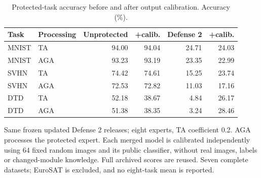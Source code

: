 \begin{table}[t]
\centering\small
\setlength{\tabcolsep}{4pt}
\caption{Protected-task accuracy before and after output calibration. Accuracy (\%).}
\label{tab:defense2_eight_calibration_target}
\begin{tabular}{@{}llrrrr@{}}
\toprule
Task & Processing & Unprotected & +calib. & Defense 2 & +calib. \\
\midrule
MNIST & TA & 94.00 & 94.04 & 24.71 & 24.03 \\
MNIST & AGA & 93.23 & 93.19 & 23.35 & 22.99 \\
\midrule
SVHN & TA & 74.42 & 74.61 & 15.25 & 23.74 \\
SVHN & AGA & 72.53 & 72.82 & 11.03 & 17.16 \\
\midrule
DTD & TA & 52.18 & 38.67 & 4.84 & 26.17 \\
DTD & AGA & 51.38 & 38.35 & 3.24 & 28.46 \\
\bottomrule
\end{tabular}
\par\smallskip
\begin{minipage}{\textwidth}\footnotesize Same frozen updated Defense 2 releases; eight experts, TA coefficient 0.2. AGA processes the protected expert. Each merged model is calibrated independently using 64 fixed random images and its public classifier, without real images, labels or changed-module knowledge. Full archived scores are reused. Seven complete datasets; EuroSAT is excluded, and no eight-task mean is reported.\end{minipage}
\end{table}
